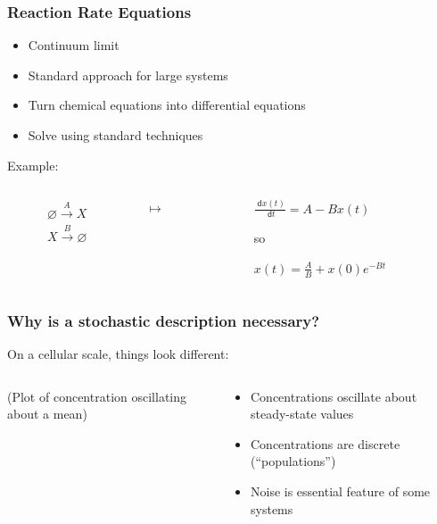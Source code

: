 \documentclass[xcolor={usenames,dvipsnames,svgnames}]{beamer}
\newcommand{\dee}{\;\mathsf{d}}
\begin{document}
\begin{frame}
    \frametitle{Reaction Rate Equations}
    \begin{itemize}
        \item Continuum limit
        \item Standard approach for large systems
        \item Turn chemical equations into differential equations
        \item Solve using standard techniques
    \end{itemize}
    \pause
    Example:
    \begin{columns}[c]
        \begin{column}{0.45\textwidth}
            \begin{align*}
                \varnothing \xrightarrow{A} X \\
                X \xrightarrow {B} \varnothing
            \end{align*}
        \end{column}
        \begin{column}{0.1\textwidth}
            \huge $\mapsto$
        \end{column}
        \begin{column}{0.45\textwidth}
            \begin{center}
                $\frac{\dee x(t)}{\dee t} = A - B x(t)$

                so

                $x(t) = \frac{A}{B} + x(0) e^{-B t}$
            \end{center}
        \end{column}
    \end{columns}
\end{frame}

\begin{frame}
    \frametitle{Why is a stochastic description necessary?}
    On a cellular scale, things look different:
    \hfill
    \begin{columns}[c]
        \begin{column}{0.5\textwidth}
            (Plot of concentration oscillating about a mean)
        \end{column}
        \begin{column}{0.5\textwidth}
            \begin{itemize}
                \item Concentrations oscillate about steady-state values
                \item Concentrations are discrete (``populations'')
                \item Noise is essential feature of some systems
            \end{itemize}
        \end{column}
    \end{columns}
\end{frame}
\end{document}
